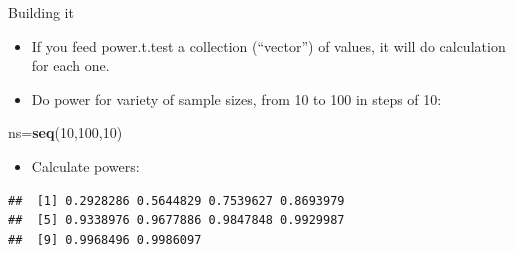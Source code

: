 \documentclass[ignorenonframetext,]{beamer}
\newenvironment{Shaded}{\begin{snugshade}}{\end{snugshade}}
\newcommand{\DataTypeTok}[1]{\textcolor[rgb]{0.13,0.29,0.53}{#1}}
\newcommand{\DecValTok}[1]{\textcolor[rgb]{0.00,0.00,0.81}{#1}}
\newcommand{\KeywordTok}[1]{\textcolor[rgb]{0.13,0.29,0.53}{\textbf{#1}}}
\newcommand{\NormalTok}[1]{#1}
\newcommand{\OperatorTok}[1]{\textcolor[rgb]{0.81,0.36,0.00}{\textbf{#1}}}
\newcommand{\StringTok}[1]{\textcolor[rgb]{0.31,0.60,0.02}{#1}}
\providecommand{\tightlist}{%
  \setlength{\itemsep}{0pt}\setlength{\parskip}{0pt}}
\begin{document}
\begin{frame}[fragile]{Building it}
\protect\hypertarget{building-it}{}

\begin{itemize}
\tightlist
\item
  If you feed power.t.test a collection (``vector'') of values, it will
  do calculation for each one.
\item
  Do power for variety of sample sizes, from 10 to 100 in steps of 10:
\end{itemize}

\begin{Shaded}
\begin{Highlighting}[]
\NormalTok{ns=}\KeywordTok{seq}\NormalTok{(}\DecValTok{10}\NormalTok{,}\DecValTok{100}\NormalTok{,}\DecValTok{10}\NormalTok{)}
\end{Highlighting}
\end{Shaded}

\begin{itemize}
\tightlist
\item
  Calculate powers:
\end{itemize}

\begin{Shaded}
\end{Shaded}

\begin{verbatim}
##  [1] 0.2928286 0.5644829 0.7539627 0.8693979
##  [5] 0.9338976 0.9677886 0.9847848 0.9929987
##  [9] 0.9968496 0.9986097
\end{verbatim}

\end{frame}
\end{document}
